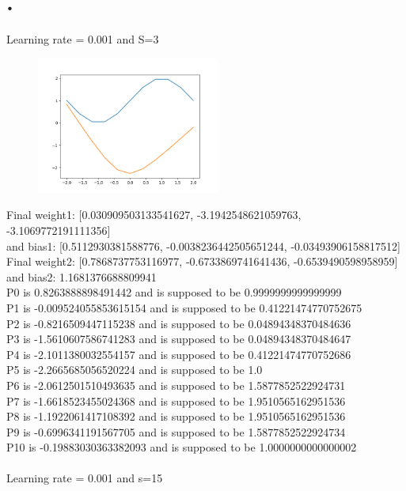 \documentclass{article}
\begin{document}
\section{.}
Learning rate = 0.001 and S=3\\
\begin{figure}[htp]
    \centering
    \includegraphics[width=6cm]{photos/1_001.png}
    \label{fig:2}
\end{figure}
Final weight1: [0.030909503133541627, -3.1942548621059763, -3.1069772191111356]\\ and bias1: [0.5112930381588776, -0.0038236442505651244, -0.03493906158817512]\\
Final weight2: [0.7868737753116977, -0.6733869741641436, -0.6539490598958959]\\ and bias2: 1.1681376688809941\\
P0 is 0.8263888898491442 and is supposed to be 0.9999999999999999\\
P1 is -0.009524055853615154 and is supposed to be 0.41221474770752675\\
P2 is -0.8216509447115238 and is supposed to be 0.04894348370484636\\
P3 is -1.5610607586741283 and is supposed to be 0.04894348370484647\\
P4 is -2.1011380032554157 and is supposed to be 0.41221474770752686\\
P5 is -2.2665685056520224 and is supposed to be 1.0\\
P6 is -2.0612501510493635 and is supposed to be 1.5877852522924731\\
P7 is -1.6618523455024368 and is supposed to be 1.9510565162951536\\
P8 is -1.1922061417108392 and is supposed to be 1.9510565162951536\\
P9 is -0.6996341191567705 and is supposed to be 1.5877852522924734\\
P10 is -0.19883030363382093 and is supposed to be 1.0000000000000002\\~\\
Learning rate = 0.001 and s=15\\
\end{document}
